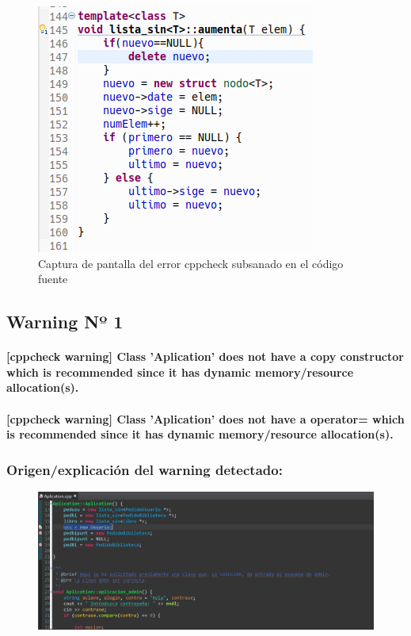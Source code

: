 			\begin{figure}[H]
				\centering
				\includegraphics[scale=0.55]{img/captura93.png}
				\caption{Captura de pantalla del error cppcheck subsanado en el código fuente}
				\label{captura9}
			\end{figure}
		
	\subsection{Warning Nº 1}
	
		\paragraph{[cppcheck warning] Class 'Aplication' does not have a copy constructor which is recommended since it has dynamic memory/resource allocation(s).}
		
		\paragraph{[cppcheck warning] Class 'Aplication' does not have a operator= which is recommended since it has dynamic memory/resource allocation(s).}
	
		\subsubsection{Origen/explicación del warning detectado:}
		
			\begin{figure}[H]
				\centering
				\includegraphics[scale=0.55]{img/esteban1.png}
				\label{esteban1}
			\end{figure}
		
